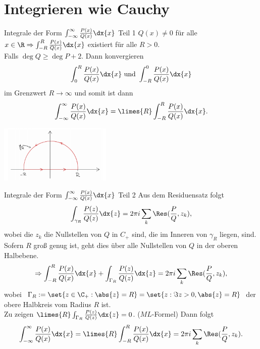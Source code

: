 \section{Integrieren wie Cauchy}

\begin{karte}{Integrale der Form \( \int_{-\infty}^\infty \frac{P(x)}{Q(x)} \dx{x} \) Teil 1}
    \(Q(x) \neq 0\) für alle \(x\in \R \Rightarrow \int_{-R}^R \frac{P(x)}{Q(x)} \dx{x}\) 
    existiert für alle \(R>0\). \\
    Falls \(\deg Q \geq \deg P+2\). Dann konvergieren 
    \[ \int_0^R \frac{P(x)}{Q(x)} \dx{x} \text{ und } \int_{-R}^0 \frac{P(x)}{Q(x)} \dx{x} \]
    im Grenzwert \(R \rightarrow \infty\) und somit ist dann 
    \[ \int_{-\infty}^\infty \frac{P(x)}{Q(x)} \dx{x} = \limes{R} \int_{-R}^R \frac{P(x)}{Q(x)} \dx{x}. \]
    \begin{center}
        \includegraphics[width=0.4\textwidth]{img/kurve-halbebene.png}
    \end{center}
\end{karte}

\begin{karte}{Integrale der Form \( \int_{-\infty}^\infty \frac{P(x)}{Q(x)} \dx{x} \) Teil 2}
    Aus dem Residuensatz folgt 
    \[ \int_{\gamma_R} \frac{P(z)}{Q(z)} \dx{z} = 2\pi i \sum_k \Res(\frac{P}{Q}, z_k), \]
    wobei die \(z_k\) die Nullstellen von \(Q\) in \(C_+\) sind, die im 
    Inneren von \(\gamma_R\) liegen, sind. Sofern \(R\) groß genug ist, 
    geht dies über alle Nullstellen von \(Q\) in der oberen Halbebene.
    \[ \Rightarrow \int_{-R}^R \frac{P(x)}{Q(x)} \dx{x} + \int_{\Gamma_R} \frac{P(z)}{Q(z)} \dx{z} = 2\pi i \sum_k \Res(\frac{P}{Q}, z_k), \]
    wobei \(\Gamma_R := \set{z\in \C_+: \abs{z} = R} = \set{z: \Im z > 0, \abs{z} = R}\) 
    der obere Halbkreis vom Radius \(R\) ist.\\
    Zu zeigen \( \limes{R} \int_{\Gamma_R} \frac{P(z)}{Q(z)} \dx{z} = 0 \). (\(ML\)-Formel) 
    Dann folgt 
    \[ \int_{-\infty}^\infty \frac{P(x)}{Q(x)} \dx{x} = 
    \limes{R} \int_{-R}^R \frac{P(x)}{Q(x)} \dx{x} 
    = 2\pi i \sum_k \Res(\frac{P}{Q}, z_k). \]
\end{karte}

